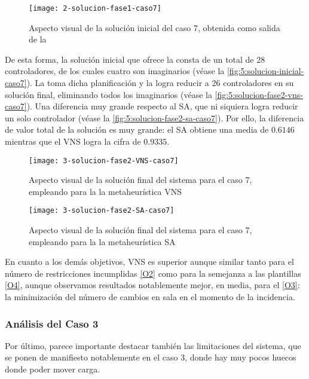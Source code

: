\begin{figure}
	\centering
	\texttt{[image: 2-solucion-fase1-caso7]}
	\caption{Aspecto visual de la solución inicial del caso 7, obtenida como salida de la \faseuno{}}
	\label{fig:5:solucion-fase1-caso7}
\end{figure}

De esta forma, la solución inicial que ofrece la \faseuno{} consta de un total de 28 controladores, de los cuales cuatro son imaginarios (véase la \autoref{fig:5:solucion-inicial-caso7}). La \fasedos{} toma dicha planificación y la logra reducir a 26 controladores en su solución final, eliminando todos los imaginarios (véase la \autoref{fig:5:solucion-fase2-vns-caso7}). Una diferencia muy grande respecto al SA, que ni siquiera logra reducir un solo controlador (véase la \autoref{fig:5:solucion-fase2-sa-caso7}). Por ello, la diferencia de valor total de la solución es muy grande: el SA obtiene una media de $0.6146$ mientras que el VNS logra la cifra de $0.9335$.

\begin{figure}
	\centering
	\texttt{[image: 3-solucion-fase2-VNS-caso7]}
	\caption{Aspecto visual de la solución final del sistema para el caso 7, empleando para la \fasedos{} la metaheurística VNS}
	\label{fig:5:solucion-fase2-vns-caso7}
\end{figure}

\begin{figure}
	\centering
	\texttt{[image: 3-solucion-fase2-SA-caso7]}
	\caption{Aspecto visual de la solución final del sistema para el caso 7, empleando para la \fasedos{} la metaheurística SA}
	\label{fig:5:solucion-fase2-sa-caso7}
\end{figure}

En cuanto a los demás objetivos, VNS es superior aunque similar tanto para el número de restricciones incumplidas \ref{O2} como para la semejanza a las plantillas \ref{O4}, aunque observamos resultados notablemente mejor, en media, para el \ref{O3}: la minimización del número de cambios en sala en el momento de la incidencia.

\subsubsection{Análisis del Caso 3}

Por último, parece importante destacar también las limitaciones del sistema, que se ponen de manifiesto notablemente en el caso 3, donde hay muy pocos huecos donde poder mover carga. 

